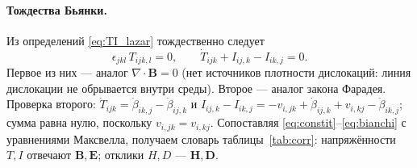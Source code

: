 \documentclass[12pt,a4paper]{article}
\begin{document}
\paragraph{Тождества Бьянки.} Из определений \eqref{eq:TI_lazar} тождественно
следует \cite[ур.~(2)]{lazar2010pla}
\begin{equation}
\epsilon_{jkl}\,T_{ijk,l}=0,\qquad \dot T_{ijk}+I_{ij,k}-I_{ik,j}=0.
\label{eq:bianchi}
\end{equation}
Первое из них --- аналог $\nabla\cdot\mathbf B=0$ (нет источников плотности
дислокаций: линия дислокации не обрывается внутри среды). Второе --- аналог закона
Фарадея. Проверка второго: $\dot T_{ijk}=\dot\beta_{ik,j}-\dot\beta_{ij,k}$ и
$I_{ij,k}-I_{ik,j}=-v_{i,jk}+\dot\beta_{ij,k}+v_{i,kj}-\dot\beta_{ik,j}$; сумма равна
нулю, поскольку $v_{i,jk}=v_{i,kj}$.
Сопоставляя \eqref{eq:constit}--\eqref{eq:bianchi} с уравнениями Максвелла,
получаем словарь таблицы~\ref{tab:corr}: напряжённости $T,I$ отвечают
$\mathbf B,\mathbf E$; отклики $H,D$ --- $\mathbf H,\mathbf D$.
\end{document}

